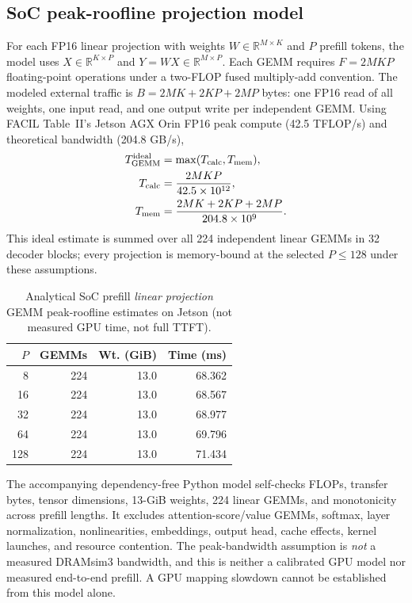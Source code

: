 \documentclass[conference,10pt]{IEEEtran}
\begin{document}
\subsection{SoC peak-roofline projection model}
For each FP16 linear projection with weights
$W\in\mathbb{R}^{M\times K}$ and $P$ prefill tokens, the model uses
$X\in\mathbb{R}^{K\times P}$ and
$Y=WX\in\mathbb{R}^{M\times P}$. Each GEMM requires
$F=2MKP$ floating-point operations under a two-FLOP
fused multiply-add convention. The modeled external traffic is
$B=2MK+2KP+2MP$ bytes: one FP16 read of all weights,
one input read, and one output write per independent GEMM.
Using FACIL Table~II's Jetson AGX Orin FP16 peak compute
(42.5 TFLOP/s) and theoretical bandwidth (204.8 GB/s),
\begin{align}
T_{\rm GEMM}^{\rm ideal} &= \max(T_{\rm calc},T_{\rm mem}),\notag\\
T_{\rm calc} &= \frac{2MKP}{42.5\times10^{12}},\notag\\
T_{\rm mem} &= \frac{2MK+2KP+2MP}{204.8\times10^9}.
\label{eq:gemm_analytical}
\end{align}
This ideal estimate is summed over all 224 independent linear
GEMMs in 32 decoder blocks; every projection is memory-bound
at the selected $P\le128$ under these assumptions.
\begin{table}[t]
\caption{Analytical SoC prefill \emph{linear projection} GEMM
peak-roofline estimates on Jetson (not measured GPU time,
not full TTFT).}
\label{tab:gemm}
\centering\footnotesize
\begin{tabular}{@{}rrrr@{}}
\toprule
$P$ & GEMMs & Wt. (GiB) & Time (ms) \\
\midrule
8 & 224 & 13.0 & 68.362 \\
16 & 224 & 13.0 & 68.567 \\
32 & 224 & 13.0 & 68.977 \\
64 & 224 & 13.0 & 69.796 \\
128 & 224 & 13.0 & 71.434 \\
\bottomrule
\end{tabular}
\end{table}
The accompanying dependency-free Python model self-checks
FLOPs, transfer bytes, tensor dimensions, 13-GiB weights,
224 linear GEMMs, and monotonicity across prefill lengths.
It excludes attention-score/value GEMMs, softmax, layer normalization,
nonlinearities, embeddings, output head, cache effects, kernel
launches, and resource contention. The peak-bandwidth assumption
is \emph{not} a measured DRAMsim3 bandwidth, and this is
neither a calibrated GPU model nor measured end-to-end prefill.
A GPU mapping slowdown cannot be established from this model alone.
\end{document}
